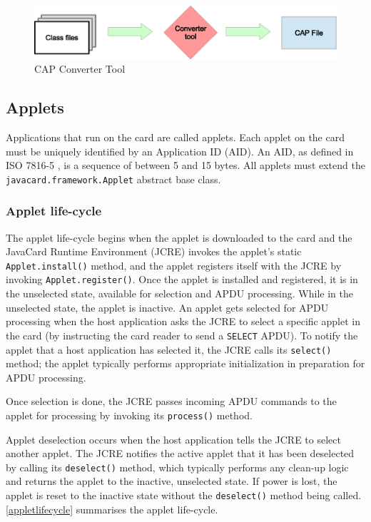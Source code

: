 \documentclass[12pt,a4paper,twoside,openright]{report}
\begin{document}
\begin{figure}[tbh]
\centerline{\includegraphics{figures/capconverter.eps}}
\caption{CAP Converter Tool}
\label{capconverter}
\end{figure}

\subsection{Applets}
\label{sec:applets}

Applications that run on the card are called applets. Each applet on the card must be uniquely identified by an Application ID (AID). An AID, as defined in ISO 7816-5 \cite{ISO78165}, is a sequence of between 5 and 15 bytes. All applets must extend the \texttt{javacard.framework.Applet} abstract base class.

\subsubsection{Applet life-cycle}

The applet life-cycle begins when the applet is downloaded to the card and the JavaCard Runtime Environment (JCRE) invokes the applet's static \texttt{Applet.install()} method, and the applet registers itself with the JCRE by invoking \texttt{Applet.register()}. Once the applet is installed and registered, it is in the unselected state, available for selection and APDU processing. While in the unselected state, the applet is inactive. An applet gets selected for APDU processing when the host application asks the JCRE to select a specific applet in the card (by instructing the card reader to send a \texttt{SELECT} APDU). To notify the applet that a host application has selected it, the JCRE calls its \texttt{select()} method; the applet typically performs appropriate initialization in preparation for APDU processing.

Once selection is done, the JCRE passes incoming APDU commands to the applet for processing by invoking its \texttt{process()} method.

Applet deselection occurs when the host application tells the JCRE to select another applet. The JCRE notifies the active applet that it has been deselected by calling its \texttt{deselect()} method, which typically performs any clean-up logic and returns the applet to the inactive, unselected state. If power is lost, the applet is reset to the inactive state without the \texttt{deselect()} method being called. \autoref{appletlifecycle} summarises the applet life-cycle.
\end{document}
